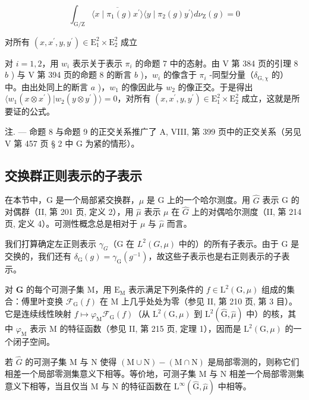 \[
\int_ {\mathrm{G} / \mathrm{Z}} \overline {{\langle x \mid \pi_ {1} (g) x ^ {\prime} \rangle}} \langle y \mid \pi_ {2} (g) y ^ {\prime} \rangle d \nu_ {\mathrm{Z}} (g) = 0
\]

对所有 \((x,x^{\prime},y,y^{\prime})\in \mathrm{E}_{1}^{2}\times \mathrm{E}_{2}^{2}\) 成立

 对 \(i=1,2\)，用 \(w_{i}\) 表示关于表示 \(\pi_{i}\) 的命题 7 中的态射。由 V 第 384 页的引理 8 \(b\) ) 与 V 第 394 页的命题 8 的断言 \(b\) )，\(w_{i}\) 的像含于 \(\pi_{i}\) -同型分量（\(\delta_{\mathrm{G},\chi}\) 的）中。由出处同上的断言 \(a\) )，\(w_{1}\) 的像因此与 \(w_{2}\) 的像正交。于是得出 \(\langle w_{1}(x\otimes x^{\prime})|w_{2}(y\otimes y^{\prime})\rangle=0\)，对所有 \((x,x^{\prime},y,y^{\prime})\in\mathrm{E}_{1}^{2}\times\mathrm{E}_{2}^{2}\) 成立，这就是所要证的公式。

注. --- 命题 8 与命题 9 的正交关系推广了 A, VIII, 第 399 页中的正交关系（另见 V 第 457 页 § 2 中 G 为紧的情形）。

\subsection{交换群正则表示的子表示}

在本节中，G 是一个局部紧交换群，\(\mu\) 是 G 上的一个哈尔测度。用 \(\hat{G}\) 表示 G 的对偶群（II, 第 201 页, 定义 2），用 \(\hat{\mu}\) 表示 \(\mu\) 在 \(\hat{G}\) 上的对偶哈尔测度（II, 第 214 页, 定义 4）。可测性概念总是相对于 \(\mu\) 与 \(\hat{\mu}\) 而言。

我们打算确定左正则表示 \(\gamma_{G}\)（G 在 \(L^{2}(G,\mu)\) 中的）的所有子表示。由于 G 是交换的，我们还有 \(\delta_{\mathrm{G}}(g)=\gamma_{\mathrm{G}}(g^{-1})\)，故这些子表示也是右正则表示的子表示。

对 \(\widehat{\mathbf{G}}\) 的每个可测子集 M，用 \(\mathrm{E_M}\) 表示满足下列条件的 \(f \in \mathrm{L}^2 (\mathrm{G},\mu)\) 组成的集合：傅里叶变换 \(\mathcal{F}_{\mathrm{G}}(f)\) 在 M 上几乎处处为零（参见 II, 第 210 页, 第 3 目）。它是连续线性映射 \(f \mapsto \varphi_{\mathrm{M}}\mathcal{F}_{\mathrm{G}}(f)\)（从 \(\mathrm{L}^2 (\mathrm{G},\mu)\) 到 \(\mathrm{L}^2 (\widehat{\mathrm{G}},\widehat{\mu})\) 中）的核，其中 \(\varphi_{\mathrm{M}}\) 表示 M 的特征函数（参见 II, 第 215 页, 定理 1），因而是 \(\mathrm{L}^2 (\mathrm{G},\mu)\) 的一个闭子空间。

若 \(\widehat{G}\) 的可测子集 M 与 N 使得 \((\mathrm{M} \cup \mathrm{N}) - (\mathrm{M} \cap \mathrm{N})\) 是局部零测的，则称它们相差一个局部零测集意义下相等。等价地，可测子集 M 与 N 相差一个局部零测集意义下相等，当且仅当 M 与 N 的特征函数在 \(\mathrm{L}^{\infty}(\widehat{\mathrm{G}}, \widehat{\mu})\) 中相等。

